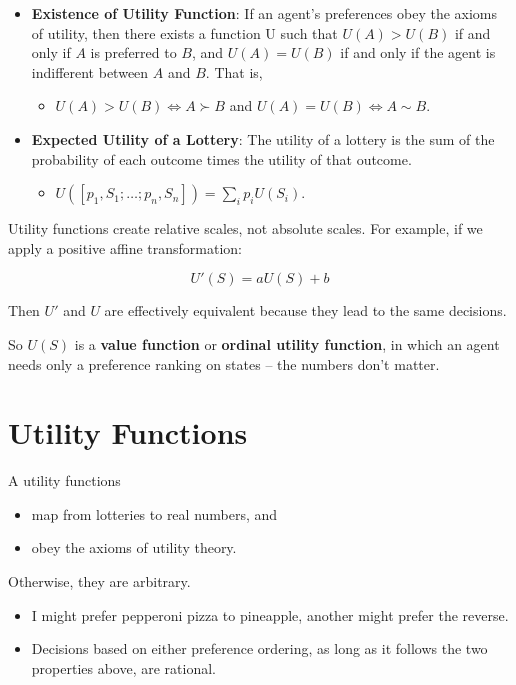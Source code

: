 \documentclass[11pt]{article}
\begin{document}
\begin{itemize}
\item \textbf{Existence of Utility Function}: If an agent’s preferences obey the axioms of utility, then there exists a function U such that \(U(A) > U(B)\) if and only if \(A\) is preferred to \(B\), and \(U(A) = U(B)\) if and only if the agent is indifferent between \(A\) and \(B\). That is,

\begin{itemize}
\item \(U(A) > U(B) \iff A \succ B\) and \(U(A) = U(B) \iff A \sim B\).
\end{itemize}

\item \textbf{Expected Utility of a Lottery}: The utility of a lottery is the sum of the probability of each outcome times the utility of that outcome.

\begin{itemize}
\item \(U([p_1,S_1; \dots ; p_n,S_n]) = \sum_i p_i U(S_i)\).
\end{itemize}
\end{itemize}

Utility functions create relative scales, not absolute scales.  For example, if we apply a positive affine transformation:

\begin{equation*}
U'(S) = aU(S) + b \tag{16.2}
\end{equation*}

Then \(U'\) and \(U\) are effectively equivalent because they lead to the same decisions.

So \(U(S)\) is a \textbf{value function} or \textbf{ordinal utility function}, in which an agent needs only a preference ranking on states -- the numbers don’t matter.
\section{Utility Functions}
\label{sec:org7c63fe1}

A utility functions

\begin{itemize}
\item map from lotteries to real numbers, and
\item obey the axioms of utility theory.
\end{itemize}

Otherwise, they are arbitrary.

\begin{itemize}
\item I might prefer pepperoni pizza to pineapple, another might prefer the reverse.
\item Decisions based on either preference ordering, as long as it follows the two properties above, are rational.
\end{itemize}
\end{document}
